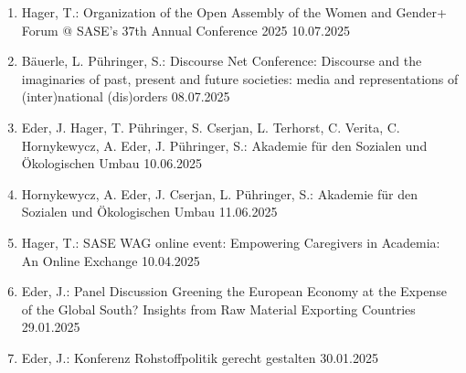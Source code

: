 \begin{enumerate}
	\item Hager, T.: Organization of the Open Assembly of the Women and Gender+ Forum @ SASE's 37th Annual Conference 2025 10.07.2025
	\item Bäuerle, L. Pühringer, S.: Discourse Net Conference: Discourse and the imaginaries of past, present and future societies: media and representations of (inter)national (dis)orders 08.07.2025
	\item Eder, J. Hager, T. Pühringer, S. Cserjan, L. Terhorst, C. Verita, C. Hornykewycz, A. Eder, J. Pühringer, S.: Akademie für den Sozialen und Ökologischen Umbau 10.06.2025
	\item Hornykewycz, A. Eder, J. Cserjan, L. Pühringer, S.: Akademie für den Sozialen und Ökologischen Umbau 11.06.2025
	\item Hager, T.: SASE WAG online event: Empowering Caregivers in Academia: An Online Exchange 10.04.2025
	\item Eder, J.: Panel Discussion \glqq Greening the European Economy at the Expense of the Global South? Insights from Raw Material Exporting Countries\grqq{} 29.01.2025
	\item Eder, J.: Konferenz \glqq Rohstoffpolitik gerecht gestalten\grqq{} 30.01.2025
\end{enumerate}
